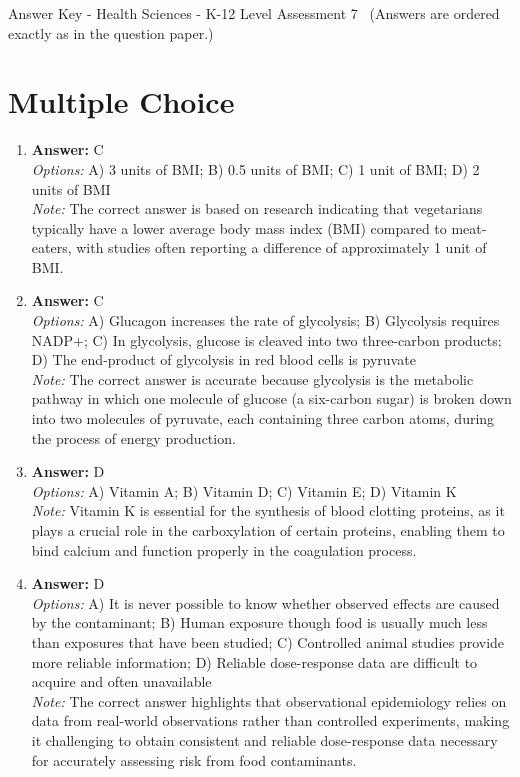 \documentclass[12pt]{article}
\begin{document}
\begin{center}
Answer Key - Health Sciences - K-12 Level Assessment 7 \
\small (Answers are ordered exactly as in the question paper.)
\end{center}

\section*{Multiple Choice}
\begin{enumerate}[label=\arabic*.]
\item \textbf{Answer:} C
\\ \textit{Options:} A) 3 units of BMI; B) 0.5 units of BMI; C) 1 unit of BMI; D) 2 units of BMI
\\ \textit{Note:} The correct answer is based on research indicating that vegetarians typically have a lower average body mass index (BMI) compared to meat-eaters, with studies often reporting a difference of approximately 1 unit of BMI.
\item \textbf{Answer:} C
\\ \textit{Options:} A) Glucagon increases the rate of glycolysis; B) Glycolysis requires NADP+; C) In glycolysis, glucose is cleaved into two three-carbon products; D) The end-product of glycolysis in red blood cells is pyruvate
\\ \textit{Note:} The correct answer is accurate because glycolysis is the metabolic pathway in which one molecule of glucose (a six-carbon sugar) is broken down into two molecules of pyruvate, each containing three carbon atoms, during the process of energy production.
\item \textbf{Answer:} D
\\ \textit{Options:} A) Vitamin A; B) Vitamin D; C) Vitamin E; D) Vitamin K
\\ \textit{Note:} Vitamin K is essential for the synthesis of blood clotting proteins, as it plays a crucial role in the carboxylation of certain proteins, enabling them to bind calcium and function properly in the coagulation process.
\item \textbf{Answer:} D
\\ \textit{Options:} A) It is never possible to know whether observed effects are caused by the contaminant; B) Human exposure though food is usually much less than exposures that have been studied; C) Controlled animal studies provide more reliable information; D) Reliable dose-response data are difficult to acquire and often unavailable
\\ \textit{Note:} The correct answer highlights that observational epidemiology relies on data from real-world observations rather than controlled experiments, making it challenging to obtain consistent and reliable dose-response data necessary for accurately assessing risk from food contaminants.

\end{enumerate}
\end{document}

